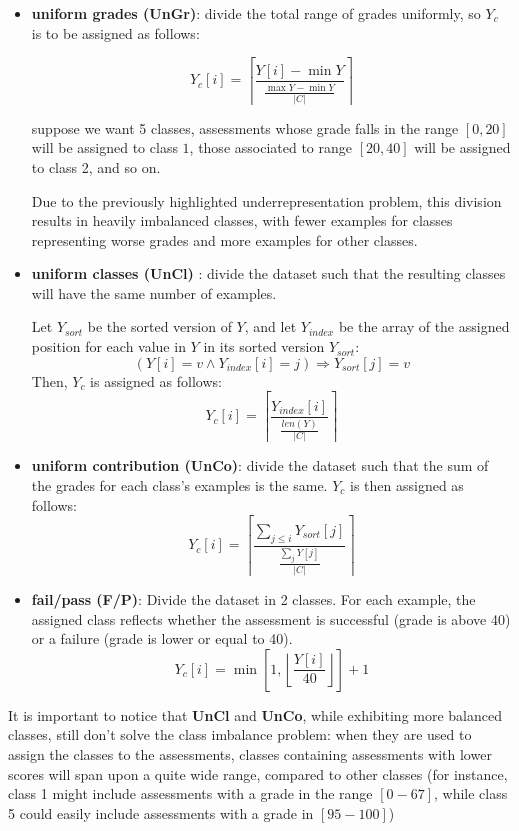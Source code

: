 \documentclass{article}
\begin{document}
\begin{itemize}
    \item \textbf{uniform grades (UnGr)}: divide the total range of grades uniformly, so $Y_c$ is to be assigned as follows:

    $$
Y_c[i]=\left\lceil\frac{Y[i]-\min{Y}}{\frac{\max{Y}-\min{Y}}{\lvert C\rvert}}\right\rceil
$$

suppose we want 5 classes, assessments whose grade falls in the range $[0,20]$ will be assigned to class $1$, those associated to range $[20,40]$ will be assigned to class 2, and so on. 

Due to the previously highlighted underrepresentation problem, this division results in heavily imbalanced classes, with fewer examples for classes representing worse grades and more examples for other classes.

 \item \textbf{uniform classes (UnCl)} : divide the dataset such that the resulting classes will have the same number of examples.

 Let $Y_{sort}$ be the sorted version of $Y$, and let $Y_{index}$ be the array of the assigned position for each value in $Y$ in its sorted version $Y_{sort}$:
$$
(Y[i]=v \land Y_{index}[i]= j ) \Rightarrow Y_{sort}[j]=v
$$
Then, $Y_c$ is assigned as follows:
$$
Y_c[i]=\left\lceil \frac{Y_{index}[i]}{\frac{len(Y)}{\lvert C \rvert}} \right\rceil
$$

\item \textbf{uniform contribution (UnCo)}: divide the dataset such that the sum of the grades for each class's examples is the same. $Y_c$ is then assigned as follows: $$
Y_c[i]=\left\lceil \frac{\sum\limits_{j\leq i} Y_{sort}[j]}{\frac{\sum\limits_j Y[j]}{\lvert C \rvert}} \right\rceil
$$

\item \textbf{fail/pass (F/P)}: Divide the dataset in 2 classes. For each example, the assigned class reflects whether the assessment is successful (grade is above 40) or a failure (grade is lower or equal to 40).
$$
Y_c[i]= \min{[1,\left\lfloor \frac{Y[i]}{40} \right\rfloor ]} +1
$$

\end{itemize}

It is important to notice that \textbf{UnCl} and \textbf{UnCo}, while exhibiting more balanced classes, still don't solve the class imbalance problem: when they are used to assign the classes to the assessments, classes containing assessments with lower scores will span upon a quite wide range, compared to other classes (for instance, class 1 might include assessments with a grade in the range $[0-67]$, while class 5 could easily include assessments with a grade in $[95-100]$)
\end{document}
